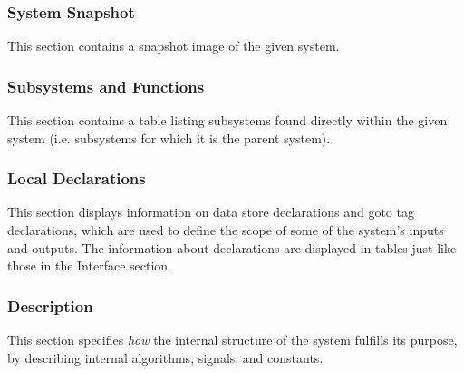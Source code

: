 \documentclass{mcscert}
\newcommand{\sigsubsnolink}{Significant Subsystems} %
\newcommand{\sigsubs}{\hyperref[def:sigsubs]{\sigsubsnolink{}}}
\begin{document}
	  \subsubsection{System Snapshot}
	  This section contains a snapshot image of the given system.
	  
	  \subsubsection{Subsystems and Functions}
	  This section contains a table listing \simulink{} subsystems found directly within the given system (i.e. subsystems for which it is the parent system).
          
      \subsubsection{Local Declarations}
      This section displays information on data store declarations and goto tag declarations, which are used to define the scope of some of the system's inputs and outputs. 
      The information about declarations are displayed in tables just like those in the Interface section.
          
      \subsubsection{Description} 
      \label{sssec:int-des-supp-description}
      This section specifies \emph{how} the internal structure of the system fulfills its purpose, by describing internal algorithms, signals, and constants. 
\end{document}
